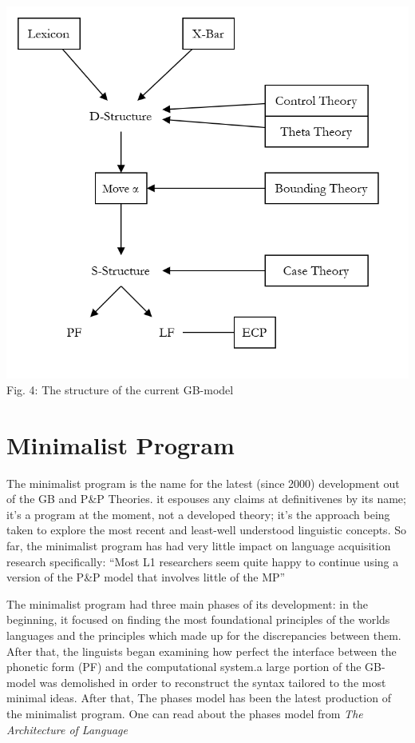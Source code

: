 \documentclass[a4paper,10pt]{article}
\begin{document}
\begin{center}
	\includegraphics[scale=0.25]{gb-model-end.png}
	\linebreak
	Fig. 4: The structure of the current GB-model \citep[p.~181]{ChUGAI}
\end{center}


\section{Minimalist Program}
The minimalist program is the name for the latest (since 2000) development out of the GB and P\&P
Theories. it espouses any claims at definitivenes by its name; it's a program at the moment, not a
developed theory; it's the approach being taken to explore the most recent and least-well understood
linguistic concepts. \citep[p.~242]{ChUGAI}
So far, the minimalist program has had very little impact on language acquisition research specifically:
``Most L1 researchers seem quite happy to continue using a version of the P\&P model that involves
little of the MP'' \citep[p.~219]{ChUGAI}

The minimalist program had three main phases of its development: in the beginning, it focused on
finding the most foundational principles of the worlds languages and the principles which made up
for the discrepancies between them. After that, the linguists began examining how perfect the interface
between the phonetic form (PF) and the computational system.a large portion of the GB-model was demolished
in order to reconstruct the syntax tailored to the most minimal ideas. \citep[p.~3]{ChUGAI}
After that, The phases model has been the latest production of the minimalist program. One can
read about the phases model from \emph{The Architecture of Language} \citet{Carr05}
\end{document}
